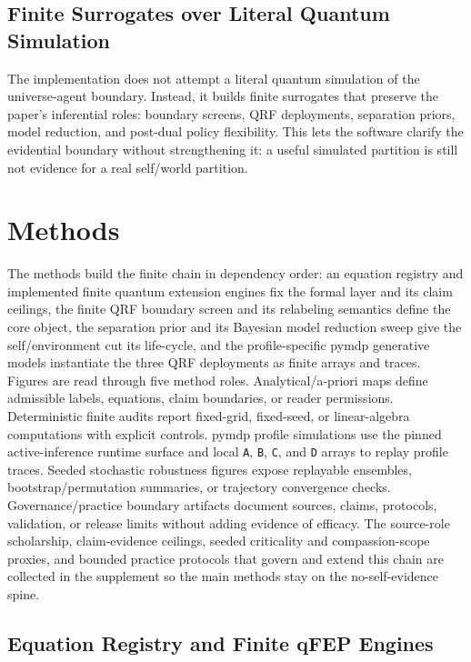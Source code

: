 \documentclass[
]{article}
\begin{document}
\subsection{Finite Surrogates over Literal Quantum
Simulation}\label{sec:introduction-limitations}

The implementation does not attempt a literal quantum simulation of the
universe-agent boundary. Instead, it builds finite surrogates that
preserve the paper's inferential roles: boundary screens, QRF
deployments, separation priors, model reduction, and post-dual policy
flexibility. This lets the software clarify the evidential boundary
without strengthening it: a useful simulated partition is still not
evidence for a real self/world partition.

\newpage

\section{Methods}\label{sec:methods}

The methods build the finite chain in dependency order: an equation
registry and implemented finite quantum extension engines fix the formal
layer and its claim ceilings, the finite QRF boundary screen and its
relabeling semantics define the core object, the separation prior and
its Bayesian model reduction sweep give the self/environment cut its
life-cycle, and the profile-specific pymdp generative models instantiate
the three QRF deployments as finite arrays and traces. Figures are read
through five method roles. Analytical/a-priori maps define admissible
labels, equations, claim boundaries, or reader permissions.
Deterministic finite audits report fixed-grid, fixed-seed, or
linear-algebra computations with explicit controls. pymdp profile
simulations use the pinned active-inference runtime surface and local
\texttt{A}, \texttt{B}, \texttt{C}, and \texttt{D} arrays to replay
profile traces. Seeded stochastic robustness figures expose replayable
ensembles, bootstrap/permutation summaries, or trajectory convergence
checks. Governance/practice boundary artifacts document sources, claims,
protocols, validation, or release limits without adding evidence of
efficacy. The source-role scholarship, claim-evidence ceilings, seeded
criticality and compassion-scope proxies, and bounded practice protocols
that govern and extend this chain are collected in the supplement so the
main methods stay on the no-self-evidence spine.

\subsection{Equation Registry and Finite qFEP
Engines}\label{sec:methods-roadmap-quantum-engines}
\end{document}
